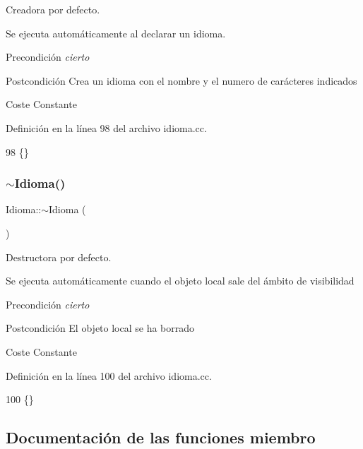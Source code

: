 Creadora por defecto. 

Se ejecuta automáticamente al declarar un idioma. \begin{DoxyPrecond}{Precondición}
{\itshape cierto} 
\end{DoxyPrecond}
\begin{DoxyPostcond}{Postcondición}
Crea un idioma con el nombre y el numero de carácteres indicados 
\end{DoxyPostcond}
\begin{DoxyParagraph}{Coste}
Constante 
\end{DoxyParagraph}


Definición en la línea 98 del archivo idioma.\+cc.


\begin{DoxyCode}
98 \{\}
\end{DoxyCode}
\mbox{\label{class_idioma_a80c90f8c9a7f824d7d7d171b9face201}} 
\subsubsection{\texorpdfstring{$\sim$\+Idioma()}{~Idioma()}}
{\footnotesize\ttfamily Idioma\+::$\sim$\+Idioma (\begin{DoxyParamCaption}{ }\end{DoxyParamCaption})}



Destructora por defecto. 

Se ejecuta automáticamente cuando el objeto local sale del ámbito de visibilidad \begin{DoxyPrecond}{Precondición}
{\itshape cierto} 
\end{DoxyPrecond}
\begin{DoxyPostcond}{Postcondición}
El objeto local se ha borrado 
\end{DoxyPostcond}
\begin{DoxyParagraph}{Coste}
Constante 
\end{DoxyParagraph}


Definición en la línea 100 del archivo idioma.\+cc.


\begin{DoxyCode}
100 \{\}
\end{DoxyCode}


\subsection{Documentación de las funciones miembro}
\mbox{\label{class_idioma_aa4a86dd82c04a280b32d98c775cf5eda}} 
